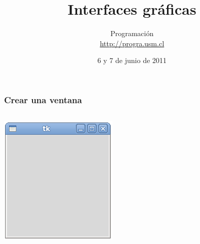 \documentclass[12pt]{beamer}
\title{Interfaces gráficas}
\author{Programación \\ \url{http://progra.usm.cl}}
\date{6 y 7 de junio de 2011}
\begin{document}
  \begin{frame}
    \maketitle
  \end{frame}

  \begin{frame}
    \frametitle{Crear una ventana}
    \begin{columns}[B]
        \LARGE
        
        \vspace{10ex}
        \vspace{10ex}
        \includegraphics[width=\textwidth]{programas/tkinter/capturas/01.png}
    \end{columns}
  \end{frame}
\end{document}
